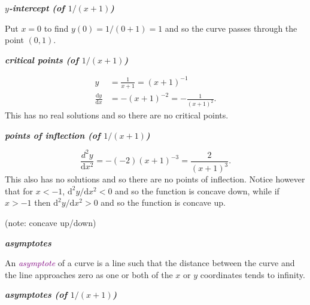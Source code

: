 \documentclass[
  english,
  11pt,
  oneside]{book}
\newcommand{\slide}{}
\theoremstyle{definition}
\theoremstyle{definition}
\theoremstyle{definition}
\theoremstyle{definition}
\theoremstyle{remark}
\begin{document}
\textbf{\emph{\(y\)-intercept (of \(1/(x+1)\))}}

\begin{notslides}

Put \(x=0\) to find \(y(0) = 1/(0+1) = 1\) and so the curve passes through the point \((0,1)\).

\end{notslides}

\slide

\textbf{\emph{critical points (of \(1/(x+1)\))}}

\begin{notslides}

\begin{align*}
y&=\frac1{x+1} = (x+1)^{-1}\\
\frac{\mathrm{d} y}{\mathrm{d} x} &= -(x+1)^{-2} = -\frac1{(x+1)^2}.
\end{align*}
This has no real solutions and so there are no critical points.

\end{notslides}

\slide

\textbf{\emph{points of inflection (of \(1/(x+1)\))}}

\begin{notslides}

\[\frac{d^2y}{\mathrm{d} x^2} = -(-2)(x+1)^{-3} = \frac2{(x+1)^3}.\]
This also has no solutions and so there are no points of inflection. Notice however that for \(x < -1\), \(\mathrm{d}^2y/\mathrm{d} x^2<0\) and so the function is concave down, while if \(x>-1\) then \(\mathrm{d}^2y/\mathrm{d} x^2 >0\) and so the function is concave up.

\end{notslides}

\begin{slidesonly}

\vfill (note: concave up/down)

\end{slidesonly}

\slide

\textbf{\emph{asymptotes}}

An \textcolor{purple}{\em asymptote} of a curve is a line such that the distance between the curve and the line approaches zero as one or both of the \(x\) or \(y\) coordinates tends to infinity.

\slide

\textbf{\emph{asymptotes (of \(1/(x+1)\))}}
\end{document}
